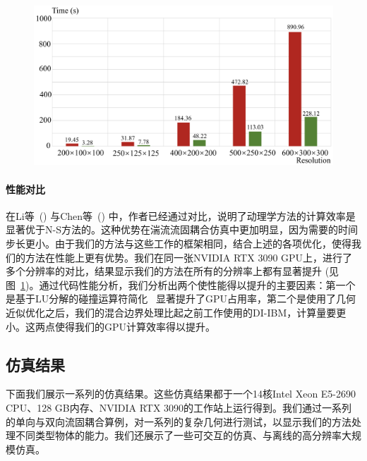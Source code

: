 \begin{figure}[!htbp]
  \centering
    \includegraphics[width=0.93\columnwidth]{figures/performance.png}
  \label{img:Performance}
\end{figure}

\paragraph{性能对比}
在Li等~(\citeyear{Li-2020}) 与Chen等~(\citeyear{Chen-2021}) 中，作者已经通过对比，说明了动理学方法的计算效率是显著优于N-S方法的。这种优势在湍流流固耦合仿真中更加明显，因为需要的时间步长更小。由于我们的方法与这些工作的框架相同，结合上述的各项优化，使得我们的方法在性能上更有优势。我们在同一张NVIDIA RTX 3090 GPU上，进行了多个分辨率的对比，结果显示我们的方法在所有的分辨率上都有显著提升 (见图~\ref{img:Performance})。通过代码性能分析，我们分析出两个使性能得以提升的主要因素：第一个是基于LU分解的碰撞运算符简化~\cite{fei2018three} 显著提升了GPU占用率，第二个是使用了几何近似优化之后，我们的混合边界处理比起之前工作使用的DI-IBM，计算量要更小。这两点使得我们的GPU计算效率得以提升。

\subsection{仿真结果}
下面我们展示一系列的仿真结果。这些仿真结果都于一个14核Intel Xeon E5-2690 CPU、128 GB内存、NVIDIA RTX 3090的工作站上运行得到。我们通过一系列的单向与双向流固耦合算例，对一系列的复杂几何进行测试，以显示我们的方法处理不同类型物体的能力。我们还展示了一些可交互的仿真、与离线的高分辨率大规模仿真。

